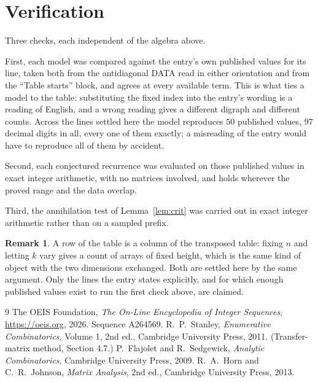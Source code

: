 \documentclass[11pt,a4paper]{article}
\theoremstyle{plain}
\theoremstyle{definition}
\newtheorem{remark}[theorem]{Remark}
\begin{document}
\section{Verification}

Three checks, each independent of the algebra above.

First, each model was compared against the entry's own published values for its line, taken
both from the antidiagonal DATA read in either orientation and from the ``Table starts''
block, and agrees at every available term. This is what ties a model to the table:
substituting the fixed index into the entry's wording is a reading of English, and a wrong
reading gives a different digraph and different counts. Across the lines settled here the
model reproduces $50$ published values, $97$ decimal digits in all, every one of
them exactly; a misreading of the entry would have to reproduce all of them by accident.

Second, each conjectured recurrence was evaluated on those published values in exact
integer arithmetic, with no matrices involved, and holds wherever the proved range and the
data overlap.

Third, the annihilation test of Lemma~\ref{lem:crit} was carried out in exact integer
arithmetic rather than on a sampled prefix.

\begin{remark}
A row of the table is a column of the transposed table: fixing $n$ and letting $k$ vary gives a
count of arrays of fixed height, which is the same kind of object with the two dimensions
exchanged. Both are settled here by the same argument. Only the lines the entry states
explicitly, and for which enough published values exist to run the first check above, are
claimed.
\end{remark}

\begin{thebibliography}{9}
 The OEIS Foundation, \emph{The On-Line Encyclopedia of Integer
Sequences}, \url{https://oeis.org}, 2026. Sequence A264569.
 R.~P.~Stanley, \emph{Enumerative Combinatorics}, Volume 1, 2nd ed.,
Cambridge University Press, 2011. (Transfer-matrix method, Section 4.7.)
 P.~Flajolet and R.~Sedgewick, \emph{Analytic Combinatorics}, Cambridge
University Press, 2009.
 R.~A.~Horn and C.~R.~Johnson, \emph{Matrix Analysis}, 2nd ed., Cambridge
University Press, 2013.
\end{thebibliography}
\end{document}
